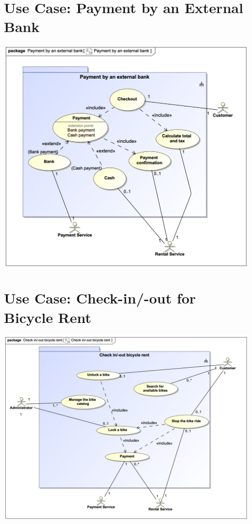 \documentclass[a4paper, 12pt]{article}
\begin{document}
\section{Use Case: Payment by an External Bank}
\begin{center}
\includegraphics[scale=0.5]{02-e-bike-rental-service-variant-1-02.png}
\end{center}

\section{Use Case: Check-in/-out for Bicycle Rent}
\begin{center}
\includegraphics[scale=0.5]{02-e-bike-rental-service-variant-1-03.png}
\end{center}
\end{document}
